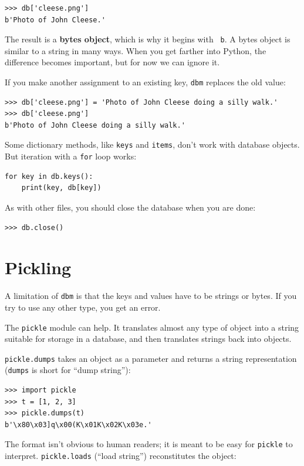 \documentclass[10pt]{book}
\begin{document}
\begin{verbatim}
>>> db['cleese.png']
b'Photo of John Cleese.'
\end{verbatim}
%
The result is a {\bf bytes object}, which is why it begins with {\tt
  b}.  A bytes object is similar to a string in many ways.  When you
get farther into Python, the difference becomes important, but for now
we can ignore it.

If you make another assignment to an existing key, {\tt dbm} replaces
the old value:

\begin{verbatim}
>>> db['cleese.png'] = 'Photo of John Cleese doing a silly walk.'
>>> db['cleese.png']
b'Photo of John Cleese doing a silly walk.'
\end{verbatim}
%

Some dictionary methods, like {\tt keys} and {\tt items}, don't
work with database objects.  But iteration with a {\tt for}
loop works:

\begin{verbatim}
for key in db.keys():
    print(key, db[key])
\end{verbatim}
%
As with other files, you should close the database when you are
done:

\begin{verbatim}
>>> db.close()
\end{verbatim}
%


\section{Pickling}

A limitation of {\tt dbm} is that the keys and values have to be
strings or bytes.  If you try to use any other type, you get an error.
 

The {\tt pickle} module can help.  It translates
almost any type of object into a string suitable for storage in a
database, and then translates strings back into objects.

{\tt pickle.dumps} takes an object as a parameter and returns
a string representation ({\tt dumps} is short for ``dump string''):

\begin{verbatim}
>>> import pickle
>>> t = [1, 2, 3]
>>> pickle.dumps(t)
b'\x80\x03]q\x00(K\x01K\x02K\x03e.'
\end{verbatim}
%
The format isn't obvious to human readers; it is meant to be
easy for {\tt pickle} to interpret.  {\tt pickle.loads}
(``load string'') reconstitutes the object:
\end{document}
